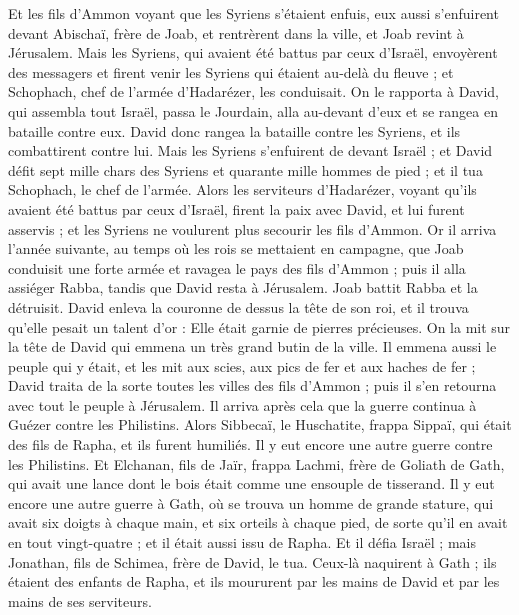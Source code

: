 \begin{multicols}{2}
Et les fils d'Ammon voyant que les Syriens s'étaient enfuis, eux aussi s'enfuirent devant Abischaï, frère de Joab, et rentrèrent dans la ville, et Joab revint à Jérusalem.
Mais les Syriens, qui avaient été battus par ceux d'Israël, envoyèrent des messagers et firent venir les Syriens qui étaient au-delà du fleuve ; et Schophach, chef de l'armée d'Hadarézer, les conduisait.
On le rapporta à David, qui assembla tout Israël, passa le Jourdain, alla au-devant d'eux et se rangea en bataille contre eux. David donc rangea la bataille contre les Syriens, et ils combattirent contre lui.
Mais les Syriens s'enfuirent de devant Israël ; et David défit sept mille chars des Syriens et quarante mille hommes de pied ; et il tua Schophach, le chef de l'armée.
Alors les serviteurs d'Hadarézer, voyant qu'ils avaient été battus par ceux d'Israël, firent la paix avec David, et lui furent asservis ; et les Syriens ne voulurent plus secourir les fils d'Ammon.
\VerseOne{}Or il arriva l'année suivante, au temps où les rois se mettaient en campagne, que Joab conduisit une forte armée et ravagea le pays des fils d'Ammon ; puis il alla assiéger Rabba, tandis que David resta à Jérusalem. Joab battit Rabba et la détruisit.
David enleva la couronne de dessus la tête de son roi, et il trouva qu'elle pesait un talent d'or : Elle était garnie de pierres précieuses. On la mit sur la tête de David qui emmena un très grand butin de la ville.
Il emmena aussi le peuple qui y était, et les mit aux scies, aux pics de fer et aux haches de fer ; David traita de la sorte toutes les villes des fils d'Ammon ; puis il s'en retourna avec tout le peuple à Jérusalem.
Il arriva après cela que la guerre continua à Guézer contre les Philistins. Alors Sibbecaï, le Huschatite, frappa Sippaï, qui était des fils de Rapha, et ils furent humiliés.
Il y eut encore une autre guerre contre les Philistins. Et Elchanan, fils de Jaïr, frappa Lachmi, frère de Goliath de Gath, qui avait une lance dont le bois était comme une ensouple de tisserand.
Il y eut encore une autre guerre à Gath, où se trouva un homme de grande stature, qui avait six doigts à chaque main, et six orteils à chaque pied, de sorte qu'il en avait en tout vingt-quatre ; et il était aussi issu de Rapha.
Et il défia Israël ; mais Jonathan, fils de Schimea, frère de David, le tua.
Ceux-là naquirent à Gath ; ils étaient des enfants de Rapha, et ils moururent par les mains de David et par les mains de ses serviteurs.

\end{multicols}
